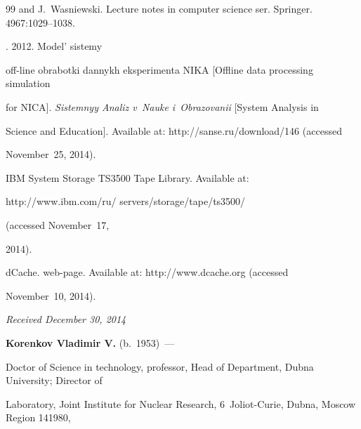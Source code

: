 {{\begin{thebibliography}{99}
and J.~Wasniewski. Lecture notes in computer science ser. Springer. 4967:1029--1038.




. 2012. Model' sistemy


off-line obrabotki dannykh eksperimenta NIKA [Offline data processing simulation


for NICA]. \textit{Sistemnyy Analiz v~Nauke i~Obrazovanii} [System Analysis in


Science and Education]. Available at: {\sf http://sanse.ru/download/146} (accessed


November~25, 2014).




IBM System Storage TS3500 Tape Library. Available at:    {\sf


http://www.ibm.com/ru/ servers/storage/tape/ts3500/} (accessed November~17,


2014).




dCache. web-page. Available at: {\sf http://www.dcache.org} (accessed


November~10, 2014).


\end{thebibliography}


} }








\vspace*{-6pt}





\hfill{\small\textit{Received December 30, 2014}}





\vspace*{-6pt}





\Contr





\noindent


\textbf{Korenkov Vladimir V.} (b.\ 1953)~---


Doctor of Science in technology, professor, Head of Department, Dubna University; Director of


Laboratory, Joint Institute for Nuclear Research, 6~Joliot-Curie, Dubna, Moscow Region 141980,



